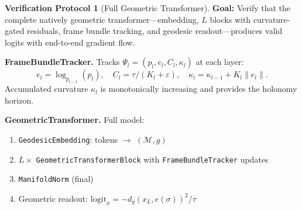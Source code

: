 \documentclass[11pt,a4paper]{article}
\theoremstyle{definition}
\newtheorem{protocol}[theorem]{Verification Protocol}
\theoremstyle{remark}
\newcommand{\Mman}{(\mathcal{M}, g)}
\begin{document}
\begin{protocol}[Full Geometric Transformer]%
\label{prot:full_model}
\textbf{Goal:} Verify that the complete natively geometric 
transformer---embedding, $L$ blocks with curvature-gated residuals, 
frame bundle tracking, and geodesic readout---produces valid logits 
with end-to-end gradient flow.

\textbf{FrameBundleTracker.} Tracks $\Psi_l = (p_l, e_l, C_l, 
\kappa_l)$ at each layer:
\[
  e_l = \log_{p_{l-1}}(p_l), \quad
  C_l = \tau / (K_l + \varepsilon), \quad
  \kappa_l = \kappa_{l-1} + K_l \|e_l\|.
\]
Accumulated curvature $\kappa_l$ is monotonically increasing and 
provides the holonomy horizon.

\textbf{GeometricTransformer.} Full model:
\begin{enumerate}[nosep]
  \item \texttt{GeodesicEmbedding}: tokens $\to$ $\Mman$
  \item $L \times$ \texttt{GeometricTransformerBlock} with 
        \texttt{FrameBundleTracker} updates
  \item \texttt{ManifoldNorm} (final)
  \item Geometric readout: $\text{logit}_\sigma = 
        -d_g(x_L, e(\sigma))^2 / \tau$
\end{enumerate}


\end{protocol}
\end{document}
